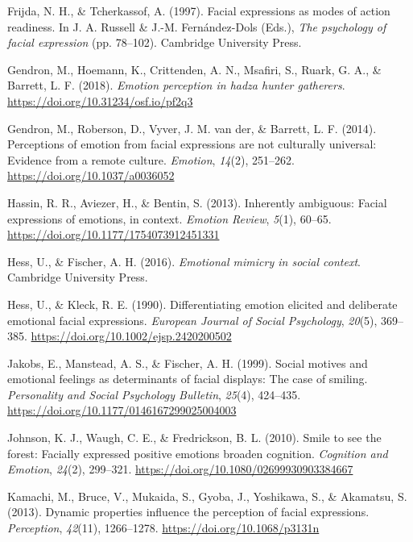 \documentclass[
  english,
  doc]{apa7}
\newlength{\cslhangindent}
\newenvironment{cslreferences}%
  {\setlength{\parindent}{0pt}%
  \everypar{\setlength{\hangindent}{\cslhangindent}}\ignorespaces}%
  {\par}
\begin{document}
\begin{cslreferences}
\leavevmode\hypertarget{ref-frijda1997facial}{}%
Frijda, N. H., \& Tcherkassof, A. (1997). Facial expressions as modes of action readiness. In J. A. Russell \& J.-M. Fernández-Dols (Eds.), \emph{The psychology of facial expression} (pp. 78--102). Cambridge University Press.

\leavevmode\hypertarget{ref-gendron2018emotion}{}%
Gendron, M., Hoemann, K., Crittenden, A. N., Msafiri, S., Ruark, G. A., \& Barrett, L. F. (2018). \emph{Emotion perception in hadza hunter gatherers}. \url{https://doi.org/10.31234/osf.io/pf2q3}

\leavevmode\hypertarget{ref-gendron2014perceptions}{}%
Gendron, M., Roberson, D., Vyver, J. M. van der, \& Barrett, L. F. (2014). Perceptions of emotion from facial expressions are not culturally universal: Evidence from a remote culture. \emph{Emotion}, \emph{14}(2), 251--262. \url{https://doi.org/10.1037/a0036052}

\leavevmode\hypertarget{ref-hassin2013inherently}{}%
Hassin, R. R., Aviezer, H., \& Bentin, S. (2013). Inherently ambiguous: Facial expressions of emotions, in context. \emph{Emotion Review}, \emph{5}(1), 60--65. \url{https://doi.org/10.1177/1754073912451331}

\leavevmode\hypertarget{ref-hess2016emotional}{}%
Hess, U., \& Fischer, A. H. (2016). \emph{Emotional mimicry in social context}. Cambridge University Press.

\leavevmode\hypertarget{ref-hess1990differentiating}{}%
Hess, U., \& Kleck, R. E. (1990). Differentiating emotion elicited and deliberate emotional facial expressions. \emph{European Journal of Social Psychology}, \emph{20}(5), 369--385. \url{https://doi.org/10.1002/ejsp.2420200502}

\leavevmode\hypertarget{ref-jakobs1999social}{}%
Jakobs, E., Manstead, A. S., \& Fischer, A. H. (1999). Social motives and emotional feelings as determinants of facial displays: The case of smiling. \emph{Personality and Social Psychology Bulletin}, \emph{25}(4), 424--435. \url{https://doi.org/10.1177/0146167299025004003}

\leavevmode\hypertarget{ref-johnson2010smile}{}%
Johnson, K. J., Waugh, C. E., \& Fredrickson, B. L. (2010). Smile to see the forest: Facially expressed positive emotions broaden cognition. \emph{Cognition and Emotion}, \emph{24}(2), 299--321. \url{https://doi.org/10.1080/02699930903384667}

\leavevmode\hypertarget{ref-kamachi2013dynamic}{}%
Kamachi, M., Bruce, V., Mukaida, S., Gyoba, J., Yoshikawa, S., \& Akamatsu, S. (2013). Dynamic properties influence the perception of facial expressions. \emph{Perception}, \emph{42}(11), 1266--1278. \url{https://doi.org/10.1068/p3131n}


\end{cslreferences}
\end{document}

